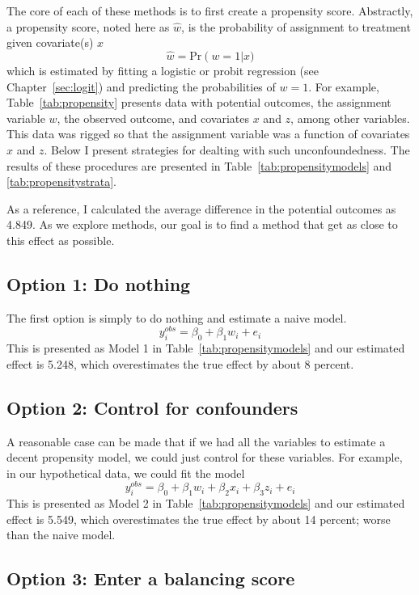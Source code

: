 The core of each of these methods is to first create a propensity score. Abstractly, a propensity score, noted here as $\hat{w}$, is the probability of assignment to treatment given covariate(s) $x$
\begin{equation}
\hat{w}=\mbox{Pr}\left(w=1\right\vert x)
\end{equation}
which is estimated by fitting a logistic or probit regression (see Chapter~\ref{sec:logit}) and predicting the probabilities of $w=1$. For example, Table~\ref{tab:propensity} presents data with potential outcomes, the assignment variable $w$, the observed outcome, and covariates $x$ and $z$, among other variables. This data was rigged so that the assignment variable was a function of covariates $x$ and $z$. Below I present strategies for dealting with such unconfoundedness. The results of these procedures are presented in Table~\ref{tab:propensitymodels} and \ref{tab:propensitystrata}.

As a reference, I calculated the average difference in the potential outcomes as 4.849. As we explore methods, our goal is to find a method that get as close to this effect as possible.

\subsection{Option 1: Do nothing}

The first option is simply to do nothing and estimate a naive model.
\[
y_i^{obs}=\beta_0+\beta_1w_i+e_i
\]
This is presented as Model 1 in Table~\ref{tab:propensitymodels} and our estimated effect is 5.248, which overestimates the true effect by about 8 percent.

\subsection{Option 2: Control for confounders}

A reasonable case can be made that if we had all the variables to estimate a decent propensity model, we could just control for these variables. For example, in our hypothetical data, we could fit the model
\[
y_i^{obs}=\beta_0+\beta_1w_i+\beta_2x_i+\beta_3z_i+e_i
\]
This is presented as Model 2 in Table~\ref{tab:propensitymodels} and our estimated effect is 5.549, which overestimates the true effect by about 14 percent; worse than the naive model.

\subsection{Option 3: Enter a balancing score}

